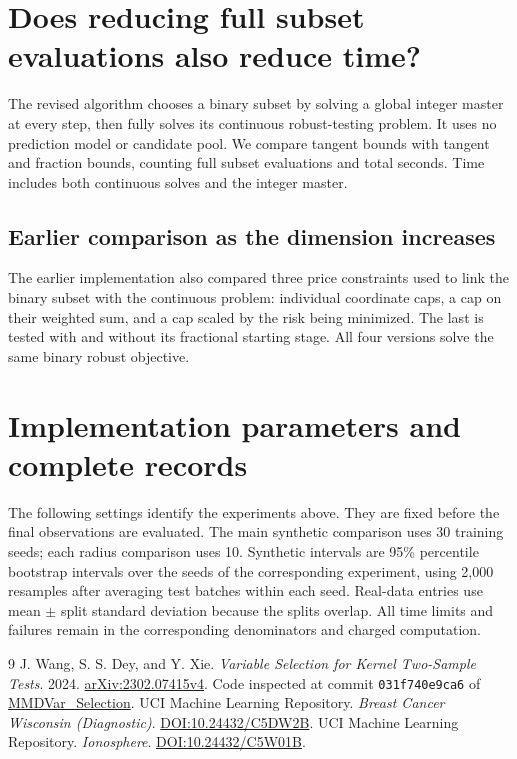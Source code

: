 \documentclass[11pt,a4paper]{article}
\begin{document}
\FloatBarrier
\section{Does reducing full subset evaluations also reduce time?}\label{sec:search}
The revised algorithm chooses a binary subset by solving a global integer
master at every step, then fully solves its continuous robust-testing problem.
It uses no prediction model or candidate pool. We compare tangent bounds with
tangent and fraction bounds, counting full subset evaluations and total seconds.
Time includes both continuous solves and the integer master.

\subsection{Earlier comparison as the dimension increases}\label{sec:compute}
The earlier implementation also compared three price constraints used to link
the binary subset with the continuous problem: individual coordinate caps,
a cap on their weighted sum, and a cap scaled by the risk being minimized.
The last is tested with and without its fractional starting stage.
All four versions solve the same binary robust objective.

\FloatBarrier
\section{Implementation parameters and complete records}\label{sec:parameters}
The following settings identify the experiments above. They are fixed before
the final observations are evaluated. The main synthetic comparison uses 30
training seeds; each radius comparison uses 10. Synthetic intervals are 95\%
percentile bootstrap intervals over the seeds of the corresponding experiment,
using 2,000 resamples after averaging test batches within each seed. Real-data entries use mean $\pm$ split standard
deviation because the splits overlap. All time limits and failures remain in
the corresponding denominators and charged computation.

\begin{thebibliography}{9}
 J. Wang, S. S. Dey, and Y. Xie.
\emph{Variable Selection for Kernel Two-Sample Tests}. 2024.
\href{https://arxiv.org/abs/2302.07415}{arXiv:2302.07415v4}.
Code inspected at commit \texttt{031f740e9ca6} of
\href{https://github.com/WalterBabyRudin/MMDVar_Selection}{MMDVar\_Selection}.
 UCI Machine Learning Repository.
\emph{Breast Cancer Wisconsin (Diagnostic)}. \href{https://doi.org/10.24432/C5DW2B}{DOI:10.24432/C5DW2B}.
 UCI Machine Learning Repository.
\emph{Ionosphere}. \href{https://doi.org/10.24432/C5W01B}{DOI:10.24432/C5W01B}.
\end{thebibliography}
\end{document}
